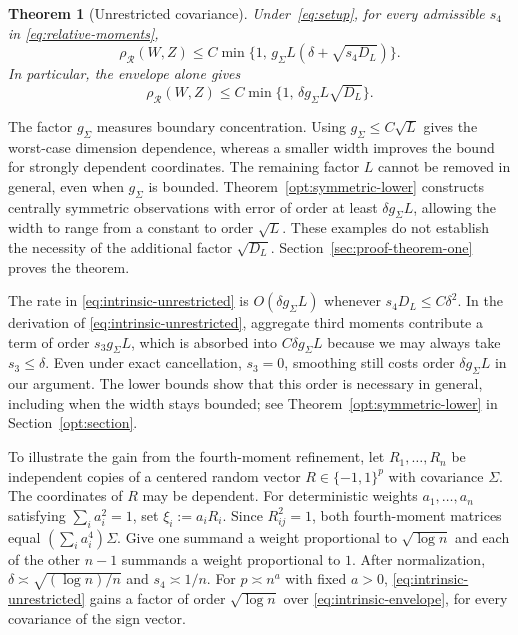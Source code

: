 \documentclass[11pt,letterpaper,twoside,leqno]{article}
\theoremstyle{bookplain}
\newtheorem{theorem}{Theorem}
\theoremstyle{bookremark}
\newcommand{\rh}{\rho_{\mathcal R}}
\begin{document}
\begin{theorem}[Unrestricted covariance]\label{thm:unrestricted}
{Under~\eqref{eq:setup}, for every admissible $s_4$ in \eqref{eq:relative-moments},}
\begin{equation}\label{eq:intrinsic-unrestricted}
{\rh(W,Z)\le C\min\{1,\,g_\Sigma L(\delta+\sqrt{s_4D_L})\}.}
\end{equation}
{In particular, the envelope alone gives}
\begin{equation}\label{eq:intrinsic-envelope}
{\rh(W,Z)\le C\min\{1,\,\delta g_\Sigma L\sqrt{D_L}\}.}
\end{equation}
\end{theorem}
{
The factor \(g_\Sigma\) measures boundary concentration. Using
\(g_\Sigma\le C\sqrt L\) gives the worst-case dimension dependence,
whereas a smaller width improves the bound for strongly dependent
coordinates. The remaining factor \(L\) cannot be removed in general,
even when \(g_\Sigma\) is bounded. Theorem~\ref{opt:symmetric-lower}
constructs centrally symmetric observations with error of order at
least \(\delta g_\Sigma L\), allowing the width to range from a
constant to order \(\sqrt L\). These examples do not establish
the necessity of the additional factor \(\sqrt{D_L}\).
Section~\ref{sec:proof-theorem-one} proves the theorem.
}

{
The rate in \eqref{eq:intrinsic-unrestricted} is \(O(\delta g_\Sigma L)\)
whenever \({s_4D_L\le C\delta^2}\). In the derivation of
\eqref{eq:intrinsic-unrestricted}, aggregate third moments contribute a
term of order \(s_3g_\Sigma L\), which is absorbed into
\(C\delta g_\Sigma L\) because we may always take \(s_3\le\delta\).
Even under exact cancellation, \(s_3=0\), smoothing still costs order
\(\delta g_\Sigma L\) in our argument. {The lower bounds show
that this order is necessary in general, including when the width
stays bounded;} see
Theorem~\ref{opt:symmetric-lower} in Section~\ref{opt:section}.
}

{To illustrate the gain from the fourth-moment
refinement, let \(R_1,\ldots,R_n\) be independent copies of a centered
random vector \(R\in\{-1,1\}^p\) with covariance \(\Sigma\). The
coordinates of \(R\) may be dependent. For deterministic weights
\(a_1,\ldots,a_n\) satisfying \(\sum_i a_i^2=1\), set
\(\xi_i:=a_iR_i\).} Since $R_{ij}^2=1$, both fourth-moment matrices equal $(\sum_i a_i^4)\Sigma$. {Give one summand a weight proportional to $\sqrt{\log n}$ and each of the other $n-1$ summands a weight proportional to $1$.} After normalization, $\delta\asymp\sqrt{(\log n)/n}$ and $s_4\asymp1/n$. For $p\asymp n^a$ with fixed $a>0$, \eqref{eq:intrinsic-unrestricted} gains a factor of order $\sqrt{\log n}$ over \eqref{eq:intrinsic-envelope}, for every covariance of the sign vector.
\end{document}
